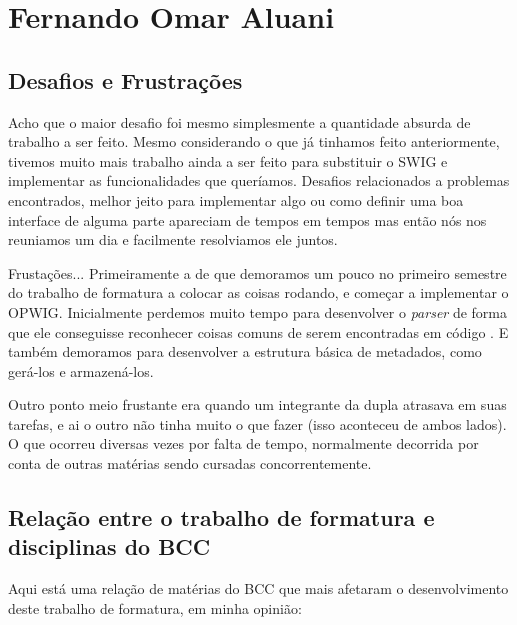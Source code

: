 \chapter{Fernando Omar Aluani}
\label{sec:omar_subjetiva}

\section{Desafios e Frustrações}
\label{sec:omar:desafios_frustracoes}

Acho que o maior desafio foi mesmo simplesmente a quantidade absurda de trabalho a
ser feito. Mesmo considerando o que já tinhamos feito anteriormente, tivemos muito
mais trabalho ainda a ser feito para substituir o SWIG e implementar as funcionalidades
que queríamos. Desafios relacionados a problemas encontrados, melhor jeito para
implementar algo ou como definir uma boa interface de alguma parte apareciam de
tempos em tempos mas então nós nos reuniamos um dia e facilmente resolviamos ele juntos.

Frustações... Primeiramente a de que demoramos um pouco no primeiro semestre do 
trabalho de formatura a colocar as coisas rodando, e começar a implementar o 
OPWIG. Inicialmente perdemos muito tempo para desenvolver o \textit{parser}
de forma que ele conseguisse reconhecer coisas comuns de serem encontradas
em código \CXX{}. E também demoramos para desenvolver a estrutura básica de 
metadados, como gerá-los e armazená-los.

Outro ponto meio frustante era quando um integrante da dupla atrasava em suas tarefas,
e ai o outro não tinha muito o que fazer (isso aconteceu de ambos lados). O que
ocorreu diversas vezes por falta de tempo, normalmente decorrida por conta de
outras matérias sendo cursadas concorrentemente.

\section{Relação entre o trabalho de formatura e disciplinas do BCC}
\label{sec:omar:relacao_disciplinas_bcc}

Aqui está uma relação de matérias do BCC que mais afetaram o desenvolvimento
deste trabalho de formatura, em minha opinião: \\

